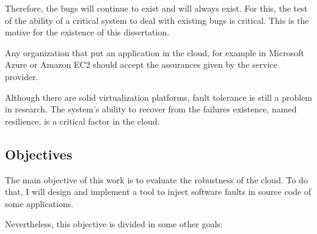 Therefore, the bugs will continue to exist and will always exist. For this, the test of the ability of a critical system to deal with existing bugs is critical. This is the motive for the existence of this dissertation.

Any organization that put an application in the cloud, for example in Microsoft Azure or Amazon EC2 should accept the assurances given by the service provider.



Although there are solid virtualization platforms, fault tolerance is still a problem in research. The system's ability to recover from the failures existence, named resilience, is a critical factor in the cloud.





\subsection{Objectives}

The main objective of this work is to evaluate the robustness of the cloud. To do that, I will design and implement a tool to inject software faults in source code of some applications.

Nevertheless, this objective is divided in some other goals:


